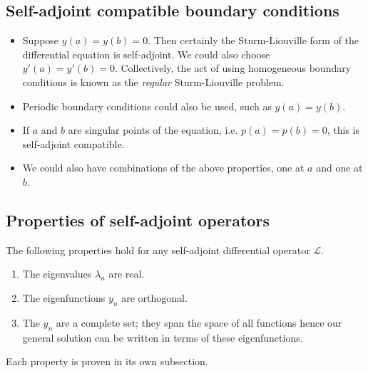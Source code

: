 \subsection{Self-adjoint compatible boundary conditions}
\begin{itemize}
	\item Suppose \( y(a) = y(b) = 0 \).
	      Then certainly the Sturm-Liouville form of the differential equation is self-adjoint.
	      We could also choose \( y'(a) = y'(b) = 0 \).
	      Collectively, the act of using homogeneous boundary conditions is known as the \textit{regular} Sturm-Liouville problem.
	\item Periodic boundary conditions could also be used, such as \( y(a) = y(b) \).
	\item If \( a \) and \( b \) are singular points of the equation, i.e.
	      \( p(a) = p(b) = 0 \), this is self-adjoint compatible.
	\item We could also have combinations of the above properties, one at \( a \) and one at \( b \).
\end{itemize}

\subsection{Properties of self-adjoint operators}
The following properties hold for any self-adjoint differential operator \( \mathcal L \).
\begin{enumerate}
	\item The eigenvalues \( \lambda_n \) are real.
	\item The eigenfunctions \( y_n \) are orthogonal.
	\item The \( y_n \) are a complete set; they span the space of all functions hence our general solution can be written in terms of these eigenfunctions.
\end{enumerate}
Each property is proven in its own subsection.


